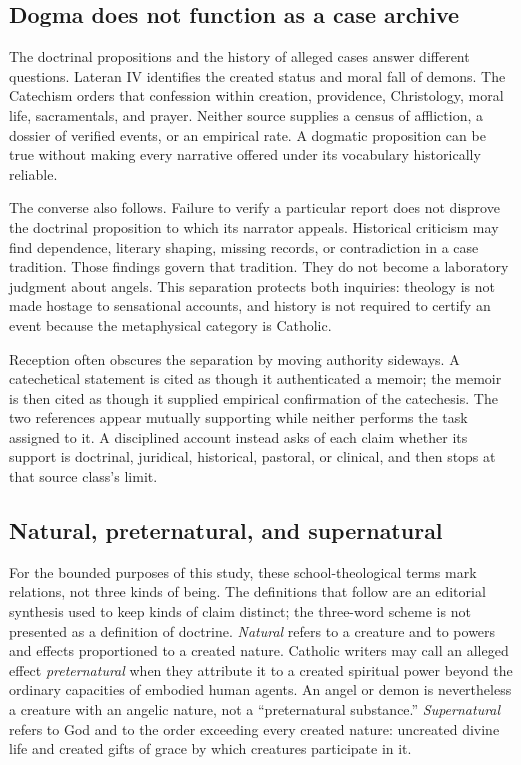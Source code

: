 \subsection{Dogma does not function as a case archive}

The doctrinal propositions and the history of alleged cases answer different
questions. Lateran IV identifies the created status and moral fall of demons.
The Catechism orders that confession within creation, providence, Christology,
moral life, sacramentals, and prayer. Neither source supplies a census of
affliction, a dossier of verified events, or an empirical rate. A dogmatic
proposition can be true without making every narrative offered under its
vocabulary historically reliable.

The converse also follows. Failure to verify a particular report does not
disprove the doctrinal proposition to which its narrator appeals. Historical
criticism may find dependence, literary shaping, missing records, or
contradiction in a case tradition. Those findings govern that tradition. They
do not become a laboratory judgment about angels. This separation protects
both inquiries: theology is not made hostage to sensational accounts, and
history is not required to certify an event because the metaphysical category
is Catholic.

Reception often obscures the separation by moving authority sideways. A
catechetical statement is cited as though it authenticated a memoir; the
memoir is then cited as though it supplied empirical confirmation of the
catechesis. The two references appear mutually supporting while neither
performs the task assigned to it. A disciplined account instead asks of each
claim whether its support is doctrinal, juridical, historical, pastoral, or
clinical, and then stops at that source class's limit.

\subsection{Natural, preternatural, and supernatural}

For the bounded purposes of this study, these school-theological terms mark
relations, not three kinds of being. The definitions that follow are an
editorial synthesis used to keep kinds of claim distinct; the three-word
scheme is not presented as a definition of doctrine.
\emph{Natural} refers to a creature and to powers and effects proportioned to a
created nature. Catholic writers may call an alleged effect
\emph{preternatural} when they attribute it to a created spiritual power beyond
the ordinary capacities of embodied human agents. An angel or demon is
nevertheless a creature with an angelic nature, not a ``preternatural
substance.'' \emph{Supernatural} refers to God and to the order exceeding every
created nature: uncreated divine life and created gifts of grace by which
creatures participate in it.

